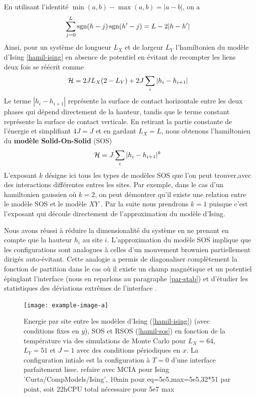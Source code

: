 En utilisant l'identité $\min(a,b)-\max(a,b)=|a-b|$, on a
\begin{align*}
    \sum_{j=0}^L \operatorname{sgn}(h-j)\operatorname{sgn}(h'-j) = L - 2 |h-h'|
\end{align*}
Ainsi, pour un système de longueur $L_X$ et de largeur $L_Y$ l'hamiltonien du modèle d'Ising \ref{hamil-ising} en absence de potentiel en évitant de recompter les liens deux fois se réécrit comme 
\begin{align}
    \mathcal{H} = 2 J L_X (2-L_Y) +2 J \sum_i |h_i-h_{i+1}|
    \label{energie-sos-ising}
\end{align}
Le terme $|h_i-h_{i+1}|$ représente la surface de contact horizontale entre les deux phases qui dépend directement de la hauteur, tandis que le terme constant représente la surface de contact verticale.
En retirant la partie constante de l'énergie et simplifiant $4 J = J$ et en gardant $L_X = L$, nous obtenons l'hamiltonien du \textbf{modèle Solid-On-Solid} (SOS)
\begin{align}
    \mathcal{H} = J \sum_i |h_i-h_{i+1}|^k
    \label{hamil-sos}
\end{align}
L'exposant $k$ désigne ici tous les types de modèles SOS que l'on peut trouver,avec des interactions différentes entres les sites. Par exemple, dans le cas d'un hamiltonien gaussien où  $k=2$, on peut démontrer qu'il existe une relation entre le modèle SOS et le modèle $XY$ \cite{knops_exact_1977}. Par la suite nous prendrons $k=1$ puisque c'est l'exposant qui découle directement de l'approximation du modèle d'Ising.

Nous avons réussi à réduire la dimensionalité du système en ne prenant en compte que la hauteur $h_i$ au site $i$. L'approximation du modèle SOS implique que les configurations sont analogues à celles d'un mouvement brownien partiellement dirigés auto-évitant. Cette analogie a permis de diagonaliser complètement la fonction de partition dans le cas où il existe un champ magnétique et un potentiel épinglant l'interface (nous en reparlons au paragraphe \ref{par-stab}) \cite{owczarek_exact_1993} et d'étudier les statistiques des déviations extrêmes de l'interface \cite{majumdar_airy_2005,schehr_universal_2006}.

\begin{figure}
    \centering
    \texttt{[image: example-image-a]}
    \caption{Energie par site entre les modèles d'Ising (\ref{hamil-ising}) (avec conditions fixes en $y$), SOS et RSOS (\ref{hamil-sos}) en fonction de la température via des simulations de Monte Carlo pour $L_X=64$, $L_Y=51$ et $J=1$ avec des conditions périodiques en $x$. La configuration intiale est la configuration à $T=0$ d'une interface parfaitement lisse. {\color{red} refaire avec MCIA pour Ising 'Curta/CompModels/Ising', 10min pour eq=5e5,max=5e5,32*51 par point, soit 22hCPU total nécessaire pour 5e7 max } }
    \label{comparaison-modeles}
\end{figure}

